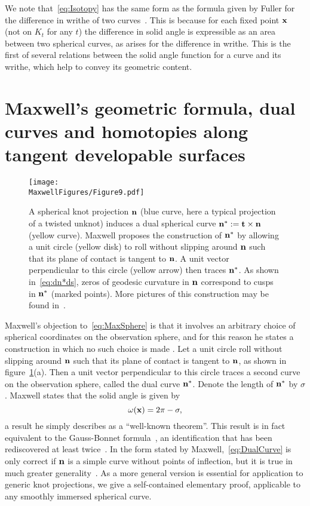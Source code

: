     We note that~\eqref{eq:Isotopy} has the same form as the formula given by Fuller for the difference in writhe of two curves~\citep{Fuller1978}. This is because for each fixed point ${\bf x}$ (not on $K_t$ for any $t$) the difference in solid angle is expressible as an area between two spherical curves, as arises for the difference in writhe. This is the first of several relations between the solid angle function for a curve and its writhe, which help to convey its geometric content.

    \section{Maxwell's geometric formula, dual curves and homotopies along tangent developable surfaces }
    \label{sec:GaussBonnet}
    \begin{figure}
        \centering
        \texttt{[image: \\MaxwellFigures/Figure9.pdf]}
        \caption[The dual curve construction.]{A spherical knot projection $\bf n$ (blue curve, here a typical projection of a twisted unknot) induces a dual spherical curve ${\bf n}^* := {\bf t} \times {\bf n}$ (yellow curve). Maxwell proposes the construction of ${\bf n}^*$ by allowing a unit circle (yellow disk) to roll without slipping around $\bf n$ such that its plane of contact is tangent to $\bf n$. A unit vector perpendicular to this circle (yellow arrow) then traces ${\bf n}^*$. As shown in~\eqref{eq:dn*ds}, zeros of geodesic curvature in $\bf n$ correspond to cusps in $\bf n^*$ (marked points). More pictures of this construction may be found in~\citep{Levi1994,Arnold1995}.   }
        \label{fig:DualCurve} 
    \end{figure}
    Maxwell's objection to~\eqref{eq:MaxSphere} is that it involves an arbitrary choice of spherical coordinates on the observation sphere, and for this reason he states a construction in which no such choice is made \citep[Art.~418]{Maxwell2}. Let a unit circle roll without slipping around ${\bf n}$ such that its plane of contact is tangent to $\bf n$, as shown in figure~\ref{fig:DualCurve}(a). Then a unit vector perpendicular to this circle traces a second curve on the observation sphere, called the dual curve ${\bf n}^*$. Denote the length of ${\bf n}^*$ by $\sigma$. Maxwell states that the solid angle is given by 
    \begin{equation}
        \omega({\bf x}) = 2\pi - \sigma ,
        \label{eq:DualCurve}
    \end{equation}
    a result he simply describes as a ``well-known theorem''. This result is in fact equivalent to the Gauss-Bonnet formula~\citep{Lee1996}, an identification that has been rediscovered at least twice~\citep{Levi1994,Arnold1995}. In the form stated by Maxwell,~\eqref{eq:DualCurve} is only correct if ${\bf n}$ is a simple curve without points of inflection, but it is true in much greater generality~\citep{Arnold1995}. As a more general version is essential for application to generic knot projections, we give a self-contained elementary proof, applicable to any smoothly immersed spherical curve. 

